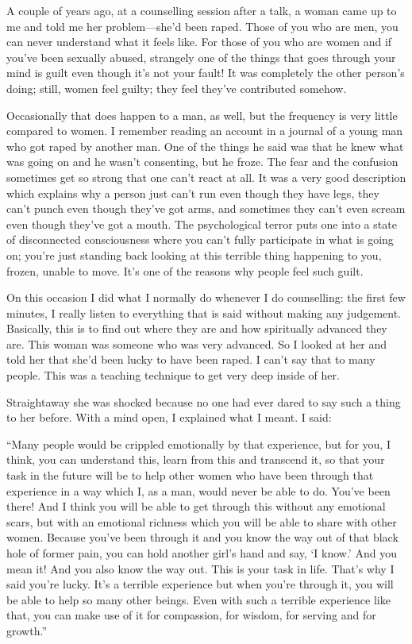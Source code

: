 \documentclass[12pt, openany]{book}
\begin{document}
A couple of years ago, at a counselling session after a talk, a woman came up to me and told me her problem—she’d been raped. Those of you who are men, you can never understand what it feels like. For those of you who are women and if you’ve been sexually abused, strangely one of the things that goes through your mind is guilt even though it’s not your fault! It was completely the other person’s doing; still, women feel guilty; they feel they’ve contributed somehow. 

Occasionally that does happen to a man, as well, but the frequency is very little compared to women. I remember reading an account in a journal of a young man who got raped by another man. One of the things he said was that he knew what was going on and he wasn’t consenting, but he froze. The fear and the confusion sometimes get so strong that one can’t react at all. It was a very good description which explains why a person just can’t run even though they have legs, they can’t punch even though they’ve got arms, and sometimes they can’t even scream even though they’ve got a mouth. The psychological terror puts one into a state of disconnected consciousness where you can’t fully participate in what is going on; you’re just standing back looking at this terrible thing happening to you, frozen, unable to move. It’s one of the reasons why people feel such guilt. 

On this occasion I did what I normally do whenever I do counselling: the first few minutes, I really listen to everything that is said without making any judgement. Basically, this is to find out where they are and how spiritually advanced they are. This woman was someone who was very advanced. So I looked at her and told her that she’d been lucky to have been raped. I can’t say that to many people. This was a teaching technique to get very deep inside of her. 

Straightaway she was shocked because no one had ever dared to say such a thing to her before. With a mind open, I explained what I meant. I said: 

“Many people would be crippled emotionally by that experience, but for you, I think, you can understand this, learn from this and transcend it, so that your task in the future will be to help other women who have been through that experience in a way which I, as a man, would never be able to do. You’ve been there! And I think you will be able to get through this without any emotional scars, but with an emotional richness which you will be able to share with other women. Because you’ve been through it and you know the way out of that black hole of former pain, you can hold another girl’s hand and say, ‘I know.’ And you mean it! And you also know the way out. This is your task in life. That’s why I said you’re lucky. It’s a terrible experience but when you’re through it, you will be able to help so many other beings. Even with such a terrible experience like that, you can make use of it for compassion, for wisdom, for serving and for growth.” 
\end{document}
